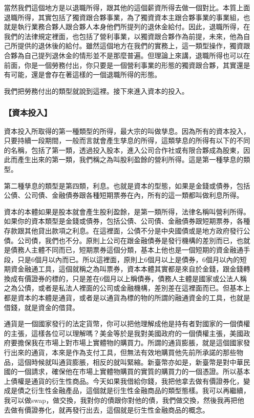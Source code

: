 \documentclass[oneside,sub3section]{ctexbook}
\begin{document}
當然我們這個地方是以退職所得，跟其他的這個薪資所得去做一個對比。本質上面退職所得，其實包括了獨資跟合夥事業，為了獨資資本主跟合夥事業的事業組，也就是執行業務合夥人跟合夥人本身他們所提列的退休金給付。因此，退職所得，在我們的法律規定裡面，也包括了營利事業，以獨資跟合夥作為前提，未來，他為自己所提供的退休後的給付。雖然這個地方在我們的實務上，這一類型操作，獨資跟合夥為自己提列退休金的情形並不是那麼普遍。但理論上來講，退職所得也可以在前面，你是一個勞務付出，你只要是一個營利事業的形態的獨資跟合夥，其實還是有可能，還是會存在著這樣的一個退職所得的形態。

我們把勞務付出的類型就說到這裡。接下來進入資本的投入。

\hypertarget{ux8cc7ux672cux6295ux5165}{%
\subsubsection{【資本投入】}\label{ux8cc7ux672cux6295ux5165}}

資本投入所取得的第一種類型的所得，最大宗的叫做孳息。因為所有的資本投入，只要持續一段期間，一般而言就會產生孳息的所得，這類孳息的所得有以下的不同的名稱，包括了第一類，透過投入股本，進入公司合作社或有限合夥成為股東，因此而產生出來的第一類，我們稱之為叫股利盈餘的營利所得。這是第一種孳息的類型。

第二種孳息的類型是第四類，利息。也就是資本的型態，如果是金錢或債券，包括公債、公司債、金融債券跟各種短期票券在內，所有的這一類都叫做利息所得。

資本的本體如果是股本就會產生股利盈餘，是第一類所得，法律名稱叫營利所得。如果你的資本類型是金錢或債券，包括公債、公司債、金融債券跟短期票券，各種存款跟其他貸出款項之利息。在這裡面，公債不分是中央國債或是地方政府發行公債。公司債，我們也不分。原則上公司在跟金融債券是發行機構的差別而已，也就是債務人主體不同而已，短期票券這個分類，基本上他也是一個短期的資金融通手段，只是6個月以內而已。所以這裡面，原則上6個月以上是債券，6個月以內的短期資金融通工具，這個就稱之為叫票券，資本本體其實都是來自於金錢，跟金錢轉換成有價證券的標的，只是差在6個月以上稱債券，債務人主體是國家或公法人稱之為公債，或者是私法人裡面的公司或金融機構，差別差在這裡面而已。但基本上都是資本的本體是通貨，或者是以通貨為標的物的所謂的融通資金的工具，也就是借錢，就是資金的借貸。

通貨是一個國家發行的法定貨幣，你可以把他理解成他是持有者對國家的一個債權的主張，這樣各位可以理解嗎？美金等於是我對美國政府的一個債權主張，美國政府要擔保我在市場上對市場上實體物的購買力。所謂的通貨膨脹，就是這個國家發行出來的通貨，本來是作為支付工具，但無法有效地購買他先前所承諾的那些物品，這個時候就叫通貨膨脹，相反的就叫緊縮。新臺幣亦如是，新臺幣是對中華民國的一個請求，確保他在市場上實體物購買的實質的購買力的一個憑證。所以基本上債權是通貨的衍生性商品。今天如果我借給你錢，我把他拿去做有價證券化，變成是債之衍生性金融產品，這個就是衍生性金融商品的類型態樣。我可以再繼續，我可以做swap，做交換，我對你的債跟你對他的債，我們做交換，然後我再把他去做有價證券化，就再發行出去，這個就是衍生性金融商品的概念。
\end{document}
